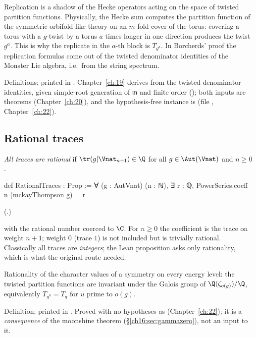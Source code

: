 \begin{physics}
Replication is a shadow of the Hecke operators acting on the space of twisted partition functions.  Physically, the
Hecke sum computes the partition function of the symmetric-orbifold-like theory on an $m$-fold cover of the torus:
covering a torus with a $g$-twist by a torus $a$ times longer in one direction produces the twist $g^a$.  This is why
the replicate in the $a$-th block is $T_{g^a}$.  In Borcherds' proof the replication formulas come out of the twisted
denominator identities of the Monster Lie algebra, i.e.\ from the string spectrum.
\end{physics}
\begin{status}
Definitions; printed in .  Chapter~\ref{ch:19} derives
 from the twisted denominator identities, given simple-root generation of $\mathfrak m$ and
finite order (); both inputs are theorems (Chapter~\ref{ch:20}),
and the hypothesis-free instance is  (file
, Chapter~\ref{ch:22}).
\end{status}

\subsection{Rational traces}

\begin{definition}\label{ch16:def:rational}
\emph{All traces are rational} if $\tr(g|\Vnat_{n+1})\in\Q$ for all $g\in\Aut(\Vnat)$ and $n\ge0$.
\end{definition}
\begin{leancode}
def RationalTraces : Prop :=
  ∀ (g : AutVnat) (n : ℕ), ∃ r : ℚ, PowerSeries.coeff n (mckayThompson g) = r
\end{leancode}
(.)
\begin{dictionary}
 with the rational number  coerced to $\C$.  For $n\ge0$ the coefficient is the trace
on weight $n+1$; weight $0$ (trace $1$) is not included but is trivially rational.  Classically all traces are
\emph{integers}; the Lean proposition asks only rationality, which is what the original route needed.
\end{dictionary}
\begin{physics}
Rationality of the character values of a symmetry on every energy level: the twisted partition functions are
invariant under the Galois group of $\Q(\zeta_{o(g)})/\Q$, equivalently $T_{g^u}=T_g$ for $u$ prime to $o(g)$.
\end{physics}
\begin{status}
Definition; printed in .  Proved with no hypotheses as
 (Chapter~\ref{ch:22}); it is a \emph{consequence} of the moonshine theorem
(\S\ref{ch16:sec:gammazero}), not an input to it.
\end{status}

